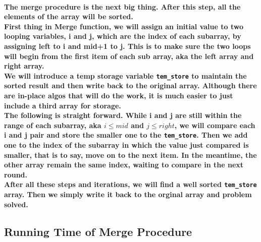 \documentclass{article}
\begin{document}
\paragraph{The merge procedure is the next big thing. After this step, all the elements of the array will be sorted. \\
First thing in Merge function, we will assign an initial value to two looping variables, i and j, which are the index of each subarray, by assigning left to i and mid+1 to j. This is to make sure the two loops will begin from the first item of each sub array, aka the left array and right array.\\
We will introduce a temp storage variable \texttt{tem\_store} to maintain the sorted result and then write back to the original array. Although there are in-place algos that will do the work, it is much easier to just include a third array for storage.\\
The following is straight forward. While i and j are still within the range of each subarray, aka $i \leq mid$ and $j \leq right$, we will compare each i and j pair and store the smaller one to the \texttt{tem\_store}. 
Then we add one to the index of the subarray in which the value just compared is smaller, that is to say, move on to the next item. In the meantime, the other array remain the same index, waiting to compare in the next round.\\
After all these steps and iterations, we will find a well sorted \texttt{tem\_store} array. Then we simply write it back to the orginal array and problem solved.}

\subsection{Running Time of Merge Procedure}
\end{document}

